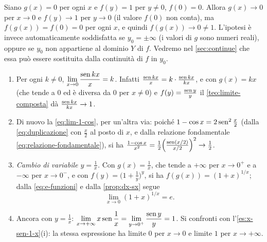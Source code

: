 \begin{osservazione}\label{oss:composta-controesempio}
Siano $g(x)=0$ per ogni $x$ e $f(y)=1$ per $y\neq0$, $f(0)=0$. Allora $g(x)\to0$ per
$x\to0$ e $f(y)\to1$ per $y\to0$ (il valore $f(0)$ non conta), ma $f(g(x))=f(0)=0$ per
ogni $x$, e quindi $f(g(x))\to0\neq1$. L'ipotesi è invece automaticamente soddisfatta
se $y_{0}=\pm\infty$ (i valori di $g$ sono numeri reali), oppure se $y_{0}$ non
appartiene al dominio $Y$ di $f$. Vedremo nel \cref{sec:continue} che essa può essere
sostituita dalla continuità di $f$ in $y_{0}$.
\end{osservazione}

\begin{esempio}\label{es:composte}
\begin{enumerate}[label=\textup{(\roman*)}]
  \item Per ogni $k\neq0$, $\displaystyle\lim_{x\to0}\frac{\operatorname{sen} kx}{x}=k$. Infatti
  $\frac{\operatorname{sen} kx}{x}=k\cdot\frac{\operatorname{sen} kx}{kx}$, e con $g(x)=kx$ (che tende a $0$ ed è
  diversa da $0$ per $x\neq0$) e $f(y)=\frac{\operatorname{sen} y}{y}$ il \cref{teo:limite-composta}
  dà $\frac{\operatorname{sen} kx}{kx}\to1$.
  \item Di nuovo la \eqref{eq:lim-1-cos}, per un'altra via: poiché
  $1-\cos x=2\operatorname{sen}^{2}\frac x2$ (dalla \eqref{eq:duplicazione} con $\frac x2$ al posto di
  $x$, e dalla relazione fondamentale \eqref{eq:relazione-fondamentale}), si ha
  $\frac{1-\cos x}{x^{2}}=\frac12\Bigl(\frac{\operatorname{sen}(x/2)}{x/2}\Bigr)^{2}\to\frac12$.
  \item \emph{Cambio di variabile $y=\frac1x$.} Con $g(x)=\frac1x$, che tende a $+\infty$
  per $x\to0^{+}$ e a $-\infty$ per $x\to0^{-}$, e con $f(y)=\bigl(1+\frac1y\bigr)^{y}$,
  si ha $f(g(x))=(1+x)^{1/x}$; dalla \eqref{eq:e-funzioni} e dalla \cref{prop:dx-sx}
  segue
  \begin{equation}\label{eq:lim-1-piu-x}
    \lim_{x\to0}(1+x)^{1/x}=e .
  \end{equation}
  \item Ancora con $y=\frac1x$: $\displaystyle\lim_{x\to+\infty}x\operatorname{sen}\frac1x
  =\lim_{y\to0^{+}}\frac{\operatorname{sen} y}{y}=1$. Si confronti con l'\cref{es:x-sen-1-x}(i): la
  stessa espressione ha limite $0$ per $x\to0$ e limite $1$ per $x\to+\infty$.
\end{enumerate}
\end{esempio}
